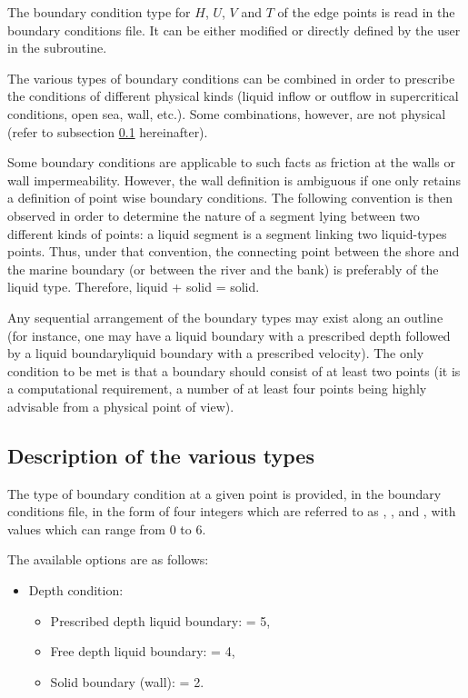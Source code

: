 The boundary condition type for $H$, $U$, $V$ and $T$ of the edge points is
read in the boundary conditions file. It can be either modified or directly
defined by the user in the  subroutine.

The various types of boundary conditions can be combined in order to prescribe
the conditions of different physical kinds (liquid inflow or outflow in
supercritical conditions, open sea, wall, etc.). Some combinations, however,
are not physical (refer to subsection \ref{sec:descr_bnd} hereinafter).

Some boundary conditions are applicable to such facts as friction at the walls
or wall impermeability. However, the wall definition is ambiguous if one only
retains a definition of point wise boundary conditions. The following
convention is then observed in order to determine the nature of a segment lying
between two different kinds of points: a liquid segment is a segment linking
two liquid-types points. Thus, under that convention, the connecting point
between the shore and the marine boundary (or between the river and the bank)
is preferably of the liquid type. Therefore, liquid + solid = solid.

Any sequential arrangement of the boundary types may exist along an outline
(for instance, one may have a liquid boundary with a prescribed depth followed
by a liquid boundaryliquid boundary with a prescribed velocity). The only
condition to be met is that a boundary should consist of at least two points
(it is a computational requirement, a number of at least four points being
highly advisable from a physical point of view).


\subsection{Description of the various types}
\label{sec:descr_bnd}

The type of boundary condition at a given point is provided, in the boundary
conditions file, in the form of four integers which are referred to as
, ,  and ,
with values which can range from 0 to 6.

The available options are as follows:

\begin{itemize}
\item Depth condition:

\begin{itemize}
\item Prescribed depth liquid boundary:  = 5,

\item Free depth liquid boundary:  = 4,

\item Solid boundary (wall):  = 2.
\end{itemize}
\end{itemize}

